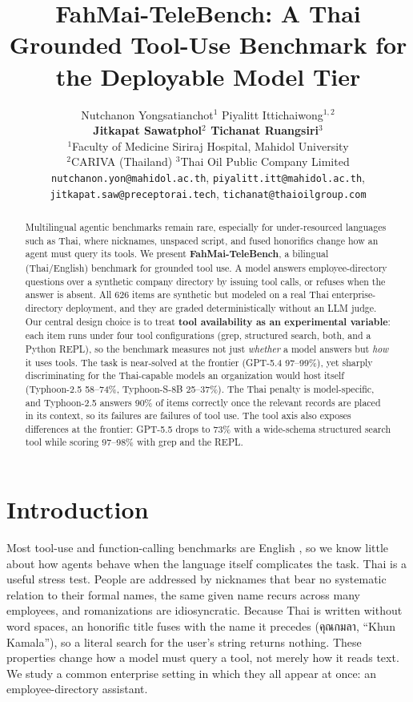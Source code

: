 \documentclass[11pt]{article}
\title{FahMai-TeleBench: A Thai Grounded Tool-Use Benchmark for the Deployable Model Tier}
\author{Nutchanon Yongsatianchot$^{1}$ \quad Piyalitt Ittichaiwong$^{1,2}$ \\
  \textbf{Jitkapat Sawatphol$^{2}$ \quad Tichanat Ruangsiri$^{3}$} \\
  $^{1}$Faculty of Medicine Siriraj Hospital, Mahidol University \\
  $^{2}$CARIVA (Thailand) \quad $^{3}$Thai Oil Public Company Limited \\
  \texttt{nutchanon.yon@mahidol.ac.th}, \texttt{piyalitt.itt@mahidol.ac.th}, \\
  \texttt{jitkapat.saw@preceptorai.tech}, \texttt{tichanat@thaioilgroup.com}}
\begin{document}
\maketitle

\begin{abstract}
Multilingual agentic benchmarks remain rare, especially for under-resourced languages such as Thai, where
nicknames, unspaced script, and fused honorifics change how an agent must query its tools. We present
\textbf{FahMai-TeleBench}, a bilingual (Thai/English) benchmark for grounded tool use. A model answers
employee-directory questions over a synthetic company directory by issuing tool calls, or refuses when
the answer is absent. All 626 items are synthetic but modeled on a real Thai enterprise-directory
deployment, and they are graded deterministically without an LLM judge. Our central design choice is to
treat \textbf{tool availability as an experimental variable}: each item runs under four tool
configurations (grep, structured search, both, and a Python REPL), so the benchmark measures not just
\emph{whether} a model answers but \emph{how} it uses tools. The task is near-solved at the frontier
(GPT-5.4 97--99\%), yet sharply discriminating for the Thai-capable models an organization would host
itself (Typhoon-2.5 58--74\%, Typhoon-S-8B 25--37\%). The Thai penalty is model-specific, and Typhoon-2.5 answers
90\% of items correctly once the relevant records are placed in its context, so its failures are
failures of tool use. The tool axis also exposes differences at the frontier: GPT-5.5 drops to 73\% with
a wide-schema structured search tool while scoring 97--98\% with grep and the REPL.
\end{abstract}

\section{Introduction}

Most tool-use and function-calling benchmarks are English
\citep{patil2023gorilla,qin2023toolllm,yao2024taubench}, so we know little about how agents behave when
the language itself complicates the task. Thai is a useful stress test. People are addressed by
nicknames that bear no systematic relation to their formal names, the same given name recurs across
many employees, and romanizations are idiosyncratic. Because Thai is written without word spaces, an
honorific title fuses with the name it precedes (คุณกมลา, ``Khun Kamala''), so a literal search for
the user's string returns nothing. These properties change how a model must query a tool, not merely how
it reads text. We study a common enterprise setting in which they all appear at once: an
employee-directory assistant.
\end{document}
